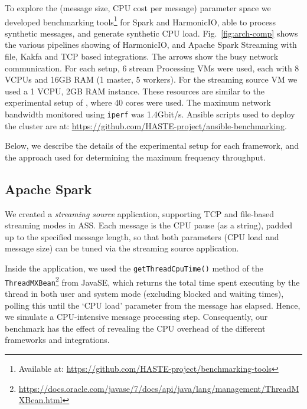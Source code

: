 \documentclass[conference]{IEEEtran}
\begin{document}
To explore the (message size, CPU cost per message) parameter space we developed benchmarking tools\footnote{Available at: \url{https://github.com/HASTE-project/benchmarking-tools}} for Spark and HarmonicIO, able to process synthetic messages, and generate synthetic CPU load.
Fig.~\ref{fig:arch-comp} shows the various pipelines showing of HarmonicIO, and Apache Spark Streaming with file, Kakfa and TCP based integrations. The arrows show the busy network communication.
For each setup, 6 stream Processing VMs were used, each with 8 VCPUs and 16GB RAM (1 master, 5 workers). For the streaming source VM we used a 1 VCPU, 2GB RAM instance.  
These resources are similar to the experimental setup of \cite{xinApacheSparkFastest2014}, where 40 cores were used.
The maximum network bandwidth monitored using \texttt{iperf} was 1.4Gbit/s. 
Ansible scripts used to deploy the cluster are at: \url{https://github.com/HASTE-project/ansible-benchmarking}.

Below, we describe the details of the experimental setup for each framework, and the approach used for determining the maximum frequency throughput.

\subsection{Apache Spark}


We created a \emph{streaming source} application, supporting TCP and file-based streaming modes in ASS. 
Each message is the CPU pause (as a string), padded up to the specified message length, so that both parameters (CPU load and message size) can be tuned via the streaming source application. 

Inside the application, we used the \texttt{getThreadCpuTime()} method of the \texttt{ThreadMXBean}\footnote{\url{https://docs.oracle.com/javase/7/docs/api/java/lang/management/ThreadMXBean.html}} from JavaSE, which returns the total time spent executing by the thread in both user and system mode (excluding blocked and waiting times), polling this until the `CPU load' parameter from the message has elapsed. Hence, we simulate a CPU-intensive message processing step. Consequently, our benchmark has the effect of revealing the CPU overhead of the different frameworks and integrations. 
\end{document}
